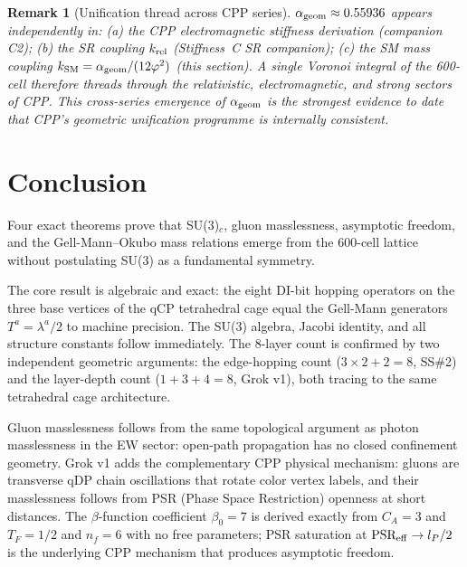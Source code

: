 \documentclass[11pt,a4paper]{article}
\newtheorem{remark}[theorem]{Remark}
\newcommand{\lP}{l_P}
\newcommand{\phig}{\varphi}
\begin{document}
\begin{remark}[Unification thread across CPP series]
$\alpha_{\rm geom} \approx 0.55936$ appears independently in:
(a) the CPP electromagnetic stiffness derivation (companion C2);
(b) the SR coupling $k_{\rm rel}$ (Stiffness~C SR companion);
(c) the SM mass coupling $k_{\rm SM} = \alpha_{\rm geom}/(12\phig^2)$
(this section).
A single Voronoi integral of the 600-cell therefore threads through
the relativistic, electromagnetic, and strong sectors of CPP.  This
cross-series emergence of $\alpha_{\rm geom}$ is the strongest
evidence to date that CPP's geometric unification programme is
internally consistent.
\end{remark}

\section{Conclusion}
\label{sec:conclusion}

Four exact theorems prove that SU(3)$_c$, gluon masslessness,
asymptotic freedom, and the Gell-Mann--Okubo mass relations emerge
from the 600-cell lattice without postulating SU(3) as a fundamental
symmetry.

The core result is algebraic and exact: the eight DI-bit hopping
operators on the three base vertices of the qCP tetrahedral cage
equal the Gell-Mann generators $T^a = \lambda^a/2$ to machine
precision.  The SU(3) algebra, Jacobi identity, and all structure
constants follow immediately.  The 8-layer count is confirmed by
two independent geometric arguments: the edge-hopping count
($3 \times 2 + 2 = 8$, SS\#2) and the layer-depth count
($1 + 3 + 4 = 8$, Grok v1), both tracing to the same tetrahedral
cage architecture.

Gluon masslessness follows from the same topological argument as
photon masslessness in the EW sector: open-path propagation has
no closed confinement geometry.  Grok v1 adds the complementary
CPP physical mechanism: gluons are transverse qDP chain oscillations
that rotate color vertex labels, and their masslessness follows
from PSR (Phase Space Restriction) openness at short distances.
The $\beta$-function coefficient $\beta_0 = 7$ is derived exactly
from $C_A = 3$ and $T_F = 1/2$ and $n_f = 6$ with no free parameters;
PSR saturation at $\text{PSR}_{\rm eff} \to \lP/2$ is the underlying
CPP mechanism that produces asymptotic freedom.
\end{document}
